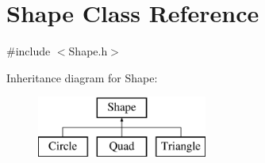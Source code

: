 \hypertarget{class_shape}{}\section{Shape Class Reference}
\label{class_shape}


{\ttfamily \#include $<$Shape.\+h$>$}

Inheritance diagram for Shape\+:\begin{figure}[H]
\begin{center}
\leavevmode
\includegraphics[height=2.000000cm]{class_shape}
\end{center}
\end{figure}
